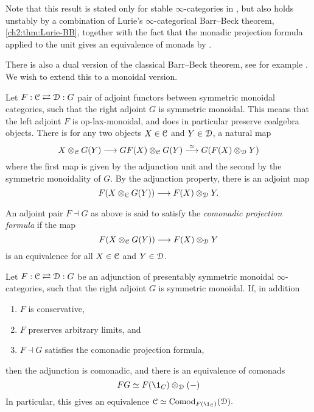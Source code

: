 \begin{remark}
    Note that this result is stated only for stable $\infty$-categories in \cite{mathew-naumann-noel_2017}, but also holds unstably by a combination of Lurie's $\infty$-categorical Barr--Beck theorem, \cref{ch2:thm:Lurie-BB}, together with the fact that the monadic projection formula applied to the unit gives an equivalence of monads by \cite[3.6]{elmanto-kolderup_2020}. 
\end{remark}

There is also a dual version of the classical Barr--Beck theorem, see for example \cite[4.5]{brantner-mathew_2023}. We wish to extend this to a monoidal version. 

Let $F:\EuScript{C}\rightleftarrows \EuScript{D}:G$ pair of adjoint functors between symmetric monoidal categories, such that the right adjoint $G$ is symmetric monoidal. This means that the left adjoint $F$ is op-lax-monoidal, and does in particular preserve coalgebra objects. There is for any two objects $X\in \EuScript{C}$ and $Y\in \EuScript{D}$, a natural map
\[X\otimes_{\EuScript{C}} G(Y)\longrightarrow GF(X)\otimes_{\EuScript{C}} G(Y) \overset{\simeq}{\longrightarrow} G(F(X)\otimes_{\EuScript{D}} Y)\]
where the first map is given by the adjunction unit and the second by the symmetric monoidality of $G$. By the adjunction property, there is an adjoint map 
\[F(X\otimes_{\EuScript{C}} G(Y)) \longrightarrow F(X)\otimes_{\EuScript{D}} Y .\]

\begin{definition}
    An adjoint pair $F\dashv G$ as above is said to satisfy the \emph{comonadic projection formula} if the map 
    \[F(X\otimes_{\EuScript{C}} G(Y)) \longrightarrow F(X)\otimes_{\EuScript{D}} Y\]
    is an equivalence for all $X\in \EuScript{C}$ and $Y\in \EuScript{D}$. 
\end{definition}

\begin{theorem}
    \label{ch2:thm:dual-monoidal-BB}
    Let $F:\EuScript{C}\rightleftarrows \EuScript{D}:G$ be an adjunction of presentably symmetric monoidal $\infty$-categories, such that the right adjoint $G$ is symmetric monoidal. If, in addition
    \begin{enumerate}
        \item $F$ is conservative,
        \item $F$ preserves arbitrary limits, and
        \item $F\dashv G$ satisfies the comonadic projection formula,
    \end{enumerate}
    then the adjunction is comonadic, and there is an equivalence of comonads 
    \[FG\simeq F(\1_C)\otimes_\D (-)\] 
    In particular, this gives an equivalence $\C\simeq \Comod_{F(\1_\C)}(\D).$
\end{theorem}

